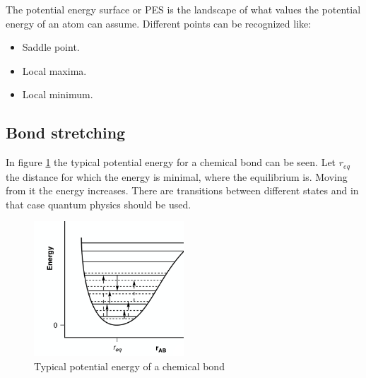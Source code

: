 The potential energy surface or PES is the landscape of what values the potential energy of an atom can assume.
Different points can be recognized like:

\begin{multicols}{2}
	\begin{itemize}
		\item Saddle point.
		\item Local maxima.
		\item Local minimum.
	\end{itemize}
\end{multicols}

	\subsection{Bond stretching}
	In figure \ref{fig:chem-bond} the typical potential energy for a chemical bond can be seen.
	Let $r_{eq}$ the distance for which the energy is minimal, where the equilibrium is.
	Moving from it the energy increases.
	There are transitions between different states and in that case quantum physics should be used.

	\begin{figure}[H]
		\centering
		\includegraphics[width=0.5\textwidth]{chem-bond}
		\caption{Typical potential energy of a chemical bond}
		\label{fig:chem-bond}
	\end{figure}

